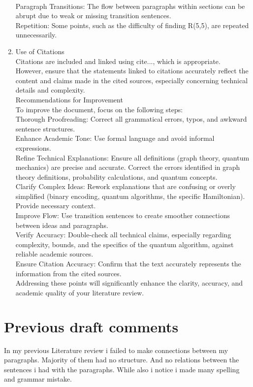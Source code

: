 \documentclass{Assignment}
\begin{document}
\begin{enumerate}
\\
Paragraph Transitions: The flow between paragraphs within sections can be abrupt due to weak or missing transition sentences.
\\
Repetition: Some points, such as the difficulty of finding R(5,5), are repeated unnecessarily.\\
\item Use of Citations
\\
Citations are included and linked using  cite{...}, which is appropriate.
\\
However, ensure that the statements linked to citations accurately reflect the content and claims made in the cited sources, especially concerning technical details and complexity.
\\
Recommendations for Improvement
\\
To improve the document, focus on the following steps:
\\
Thorough Proofreading: Correct all grammatical errors, typos, and awkward sentence structures.
\\
Enhance Academic Tone: Use formal language and avoid informal expressions.
\\
Refine Technical Explanations: Ensure all definitions (graph theory, quantum mechanics) are precise and accurate. Correct the errors identified in graph theory definitions, probability calculations, and quantum concepts.
\\
Clarify Complex Ideas: Rework explanations that are confusing or overly simplified (binary encoding, quantum algorithms, the specific Hamiltonian). Provide necessary context.
\\
Improve Flow: Use transition sentences to create smoother connections between ideas and paragraphs.
\\
Verify Accuracy: Double-check all technical claims, especially regarding complexity, bounds, and the specifics of the quantum algorithm, against reliable academic sources.
\\
Ensure Citation Accuracy: Confirm that the text accurately represents the information from the cited sources.
\\
Addressing these points will significantly enhance the clarity, accuracy, and academic quality of your literature review.

\end{enumerate}
\section*{Previous draft comments}
In my previous Literature review i failed to make connections between my paragraphs.
Majority of them had no structure.
And no relations between the sentences i had with the paragraphs.
While also i notice i made many spelling and grammar mistake.
\newpage

\end{document}
